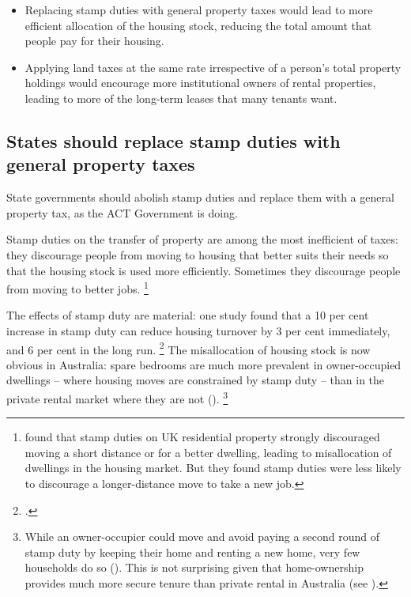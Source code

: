 \begin{itemize}
\item
  Replacing stamp duties with general property taxes would lead to more efficient allocation of the housing stock, reducing the total amount that people pay for their housing.
\item
  Applying land taxes at the same rate irrespective of a person's total property holdings would encourage more institutional owners of rental properties, leading to more of the long-term leases that many tenants want.
\end{itemize}

\subsection{States should replace stamp duties with general property taxes}\label{subsec:replacing-stamp-duties-with-general-property-taxes}

State governments should abolish stamp duties and replace them with a general property tax, as the ACT Government is doing.

Stamp duties on the transfer of property are among the most inefficient of taxes: they discourage people from moving to housing that better suits their needs so that the housing stock is used more efficiently.
Sometimes they discourage people from moving to better jobs.%
	\footnote{\textcite{hilber2017transfer} found that stamp duties on UK residential property strongly discouraged moving a short distance or for a better dwelling, leading to misallocation of dwellings in the housing market.
    But they found stamp duties were less likely to discourage a longer-distance move to take a new job.}

The effects of stamp duty are material: one study found that a 10 per cent increase in stamp duty can reduce housing turnover by 3 per cent immediately, and 6 per cent in the long run.%
	\footcite{Davidoff-Leigh-2013-How-do-stamp-duties-affect-the-housing-market}
The misallocation of housing stock is now obvious in Australia: spare bedrooms are much more prevalent in owner-occupied dwellings -- where housing moves are constrained by stamp duty -- than in the private rental market where they are not ().%
	\footnote{While an owner-occupier could move and avoid paying a second round of stamp duty by keeping their home and renting a new home, very few households do so (\textcite[][23]{RBA-Lealetal-2017-Housing-market-turnover}).
	This is not surprising given that home-ownership provides much more secure tenure than private rental in Australia (see ).}

